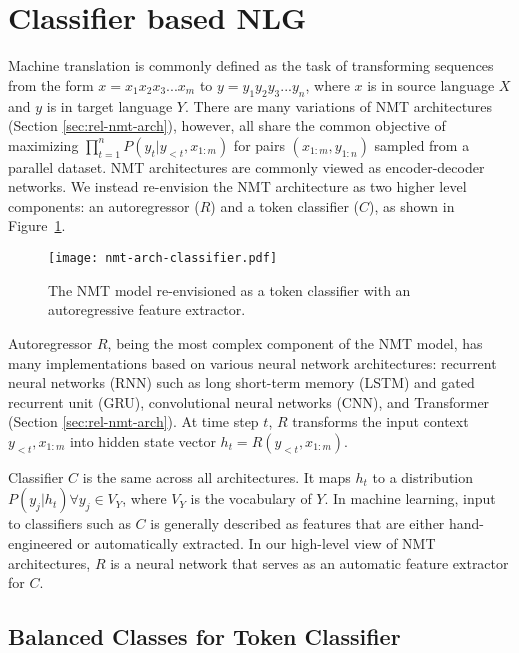 \section{Classifier based NLG}
\label{sec:classifier-nlg}

Machine translation is commonly defined as the task of transforming sequences from the form $x = x_1 x_2 x_3 ... x_m$ to $y = y_1 y_2 y_3 ... y_n$, where $x$ is in source language $X$ and $y$ is in target language $Y$. 
There are many variations of NMT architectures (Section \ref{sec:rel-nmt-arch}), however, all share the common objective of maximizing ${ \prod_{t=1}^{n} P(y_t | y_{<t}, x_{1:m})}$ for pairs $(x_{1:m}, y_{1:n})$ sampled from a parallel dataset. 
NMT architectures are commonly viewed as encoder-decoder networks.
We instead re-envision the NMT architecture as two higher level components: an autoregressor ($R$) and a token classifier ($C$), as shown in Figure~\ref{fig:nmt-architecture}.
\begin{figure}[ht]
    \centering
    \texttt{[image: nmt-arch-classifier.pdf]}
    \caption{The NMT model re-envisioned as a token classifier with an autoregressive feature extractor.}
    \label{fig:nmt-architecture}
\end{figure}

Autoregressor $R$, \cite{box2015time} being the most complex component of the NMT model, has many implementations based on various neural network architectures: recurrent neural networks (RNN) such as long short-term memory (LSTM) and gated recurrent unit (GRU), convolutional neural networks (CNN), and Transformer (Section \ref{sec:rel-nmt-arch}). 
At time step $t$, $R$ transforms the input context $y_{<t}, x_{1:m}$ into hidden state vector $h_t = R(y_{<t}, x_{1:m})$.

Classifier $C$ is the same across all architectures.
It maps $h_t$ to a distribution $P(y_j | h_t) \forall y_j \in V_Y$, where $V_Y$ is the vocabulary of $Y$. 
In machine learning, input to classifiers such as $C$ is generally described as features that are either hand-engineered or automatically extracted.
In our high-level view of NMT architectures, $R$ is a neural network that serves as an automatic feature extractor for $C$.

\subsection{Balanced Classes for Token Classifier}
\label{sec:classifier-balance}

